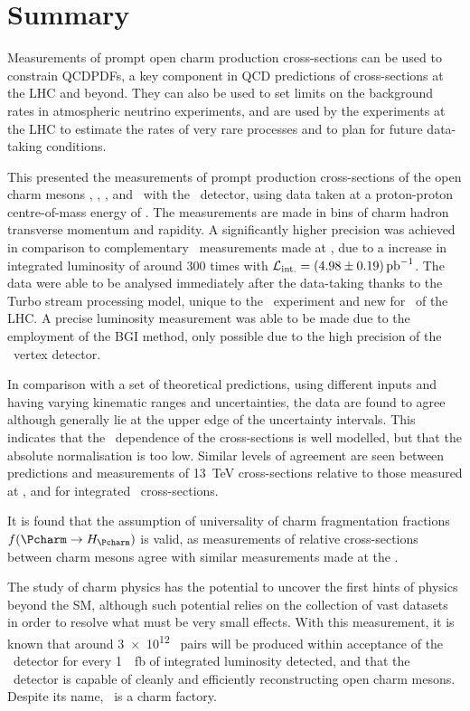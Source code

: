 \chapter{Summary}
\label{chap:prod:summary}

Measurements of prompt open charm production cross-sections can be used to 
constrain \aclp{QCDPDF}, a key component in \ac{QCD} predictions of 
cross-sections at the \ac{LHC} and beyond.
They can also be used to set limits on the background rates in atmospheric 
neutrino experiments, and are used by the experiments at the \ac{LHC} to 
estimate the rates of very rare processes and to plan for future data-taking 
conditions.

This  presented the measurements of prompt production 
cross-sections of the open charm mesons \PDzero, \PDplus, \PDsplus, and 
\PDstarp\ with the \lhcb\ detector, using data taken at a proton-proton 
centre-of-mass energy of .
The measurements are made in bins of charm hadron transverse momentum and 
rapidity.
A significantly higher precision was achieved in comparison to complementary 
\lhcb\ measurements made at , due to a increase in integrated 
luminosity of around 300 times with ${\intlumi = 
  \SI{\xsectotlumi}{\per\pico\barn}}$.
The data were able to be analysed immediately after the data-taking thanks to 
the Turbo stream processing model, unique to the \lhcb\ experiment and new for 
\runtwo\ of the \ac{LHC}.
A precise luminosity measurement was able to be made due to the employment of 
the \acl{BGI} method, only possible due to the high precision of the \lhcb\ 
vertex detector.

In comparison with a set of theoretical predictions, using different inputs and 
having varying kinematic ranges and uncertainties, the data are found to agree 
although generally lie at the upper edge of the uncertainty intervals.
This indicates that the \pTy\ dependence of the cross-sections is 
well modelled, but that the absolute normalisation is too low.
Similar levels of agreement are seen between predictions and measurements of 
\SI{13}{\TeV} cross-sections relative to those measured at \sqrtseq{7}, and for 
integrated \ccbar\ cross-sections.

It is found that the assumption of universality of charm fragmentation 
fractions $f(\cToHc)$ is valid, as measurements of relative cross-sections 
between charm mesons agree with similar measurements made at the \bfactories.

The study of charm physics has the potential to uncover the first hints of 
physics beyond the \ac{SM}, although such potential relies on the collection of 
vast datasets in order to resolve what must be very small effects.
With this measurement, it is known that around \num{3e12} \ccbar\ pairs will be 
produced within acceptance of the \lhcb\ detector for every 
\SI{1}{\per\femto\barn} of integrated luminosity detected, and that the \lhcb\ 
detector is capable of cleanly and efficiently reconstructing open charm 
mesons.
Despite its name, \lhcb\ is a charm factory.
